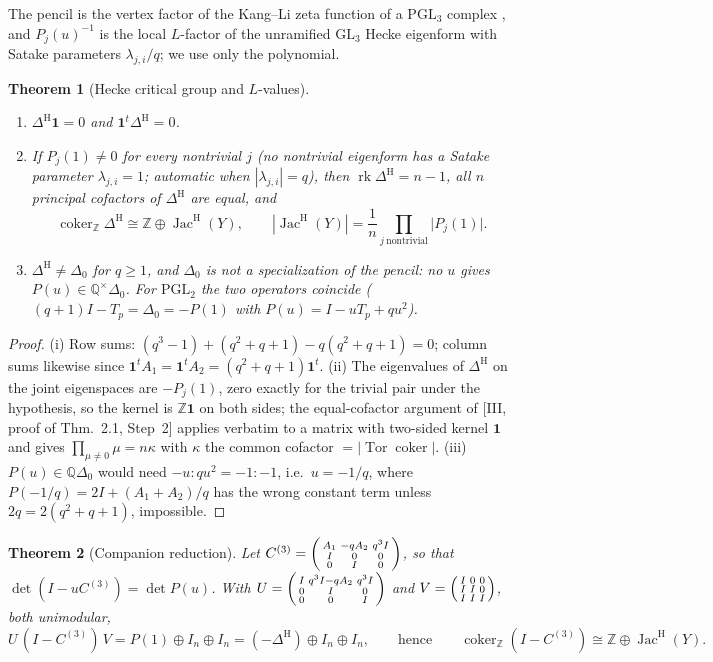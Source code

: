 \documentclass[11pt]{amsart}
\numberwithin{equation}{section}
\newtheorem{theorem}{Theorem}[section]
\theoremstyle{definition}
\theoremstyle{remark}
\newcommand{\Z}{\mathbb{Z}}
\newcommand{\Q}{\mathbb{Q}}
\newcommand{\Jac}{\operatorname{Jac}}
\newcommand{\coker}{\operatorname{coker}}
\newcommand{\Tor}{\operatorname{Tor}}
\newcommand{\rk}{\operatorname{rk}}
\newcommand{\PGL}{\mathrm{PGL}}
\newcommand{\DeltaH}{\Delta^{\mathrm{H}}}
\newcommand{\JacH}{\Jac^{\mathrm{H}}}
\newcommand{\Cthree}{C^{(3)}}
\begin{document}
The pencil is the vertex factor of the Kang--Li zeta function of a $\PGL_3$ complex
\cite{KL}, and $P_j(u)^{-1}$ is the local $L$-factor of the unramified $\mathrm{GL}_3$
Hecke eigenform with Satake parameters $\lambda_{j,i}/q$; we use only the polynomial.

\begin{theorem}[Hecke critical group and $L$-values]\label{thm:hecke}
\begin{enumerate}
\item[(i)] $\DeltaH\mathbf1=0$ and $\mathbf1^{t}\DeltaH=0$.
\item[(ii)] If $P_j(1)\neq0$ for every nontrivial $j$ (no nontrivial eigenform has a
Satake parameter $\lambda_{j,i}=1$; automatic when $|\lambda_{j,i}|=q$), then
$\rk\DeltaH=n-1$, all $n$ principal cofactors of $\DeltaH$ are equal, and
\[
\coker_\Z\DeltaH\cong\Z\oplus\JacH(Y),\qquad
|\JacH(Y)|=\frac1n\prod_{j\ \mathrm{nontrivial}}\bigl|P_j(1)\bigr| .
\]
\item[(iii)] $\DeltaH\neq\Delta_0$ for $q\ge1$, and $\Delta_0$ is not a specialization of the
pencil: no $u$ gives $P(u)\in\Q^{\times}\Delta_0$. For $\PGL_2$ the two operators coincide
($(q{+}1)I-T_p=\Delta_0=-P(1)$ with $P(u)=I-uT_p+qu^{2}$).
\end{enumerate}
\end{theorem}

\begin{proof}
(i) Row sums: $(q^{3}-1)+(q^{2}+q+1)-q(q^{2}+q+1)=0$; column sums likewise since
$\mathbf1^{t}A_1=\mathbf1^{t}A_2=(q^{2}+q+1)\mathbf1^{t}$. (ii) The eigenvalues of $\DeltaH$
on the joint eigenspaces are $-P_j(1)$, zero exactly for the trivial pair under the
hypothesis, so the kernel is $\Z\mathbf1$ on both sides; the equal-cofactor argument of
[III, proof of Thm.~2.1, Step~2] applies verbatim to a matrix with two-sided kernel
$\mathbf1$ and gives $\prod_{\mu\neq0}\mu=n\kappa$ with $\kappa$ the common cofactor
$=|\Tor\coker|$. (iii) $P(u)\in\Q\Delta_0$ would need $-u:qu^{2}=-1:-1$, i.e.\ $u=-1/q$,
where $P(-1/q)=2I+(A_1+A_2)/q$ has the wrong constant term unless $2q=2(q^{2}+q+1)$,
impossible.
\end{proof}

\begin{theorem}[Companion reduction]\label{thm:companion}
Let $\Cthree=\begin{psmallmatrix}A_1&-qA_2&q^{3}I\\ I&0&0\\0&I&0\end{psmallmatrix}$, so
that $\det(I-u\Cthree)=\det P(u)$. With
$U=\begin{psmallmatrix}I&q^{3}I-qA_2&q^{3}I\\0&I&0\\0&0&I\end{psmallmatrix}$ and
$V=\begin{psmallmatrix}I&0&0\\ I&I&0\\ I&I&I\end{psmallmatrix}$, both unimodular,
\[
U\,(I-\Cthree)\,V=P(1)\oplus I_n\oplus I_n=(-\DeltaH)\oplus I_n\oplus I_n,
\qquad\text{hence}\qquad \coker_\Z(I-\Cthree)\cong\Z\oplus\JacH(Y).
\]
\end{theorem}
\end{document}
